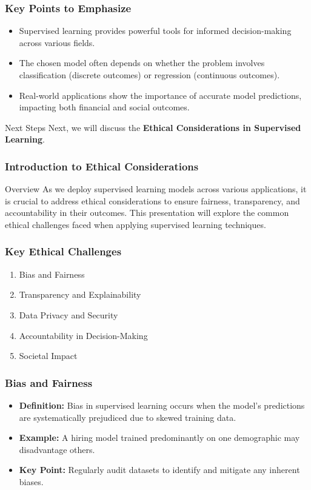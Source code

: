 \documentclass[aspectratio=169]{beamer}
\begin{document}
\begin{frame}[fragile]
    \frametitle{Key Points to Emphasize}
    \begin{itemize}
        \item Supervised learning provides powerful tools for informed decision-making across various fields.
        \item The chosen model often depends on whether the problem involves classification (discrete outcomes) or regression (continuous outcomes).
        \item Real-world applications show the importance of accurate model predictions, impacting both financial and social outcomes.
    \end{itemize}

    \begin{block}{Next Steps}
        Next, we will discuss the \textbf{Ethical Considerations in Supervised Learning}.
    \end{block}
\end{frame}

\begin{frame}[fragile]
    \frametitle{Introduction to Ethical Considerations}
    \begin{block}{Overview}
        As we deploy supervised learning models across various applications, it is crucial to address ethical considerations to ensure fairness, transparency, and accountability in their outcomes. This presentation will explore the common ethical challenges faced when applying supervised learning techniques.
    \end{block}
\end{frame}

\begin{frame}[fragile]
    \frametitle{Key Ethical Challenges}
    \begin{enumerate}
        \item Bias and Fairness
        \item Transparency and Explainability
        \item Data Privacy and Security
        \item Accountability in Decision-Making
        \item Societal Impact
    \end{enumerate}
\end{frame}

\begin{frame}[fragile]
    \frametitle{Bias and Fairness}
    \begin{itemize}
        \item \textbf{Definition:} Bias in supervised learning occurs when the model's predictions are systematically prejudiced due to skewed training data.
        \item \textbf{Example:} A hiring model trained predominantly on one demographic may disadvantage others.
        \item \textbf{Key Point:} Regularly audit datasets to identify and mitigate any inherent biases.
    \end{itemize}
\end{frame}
\end{document}
